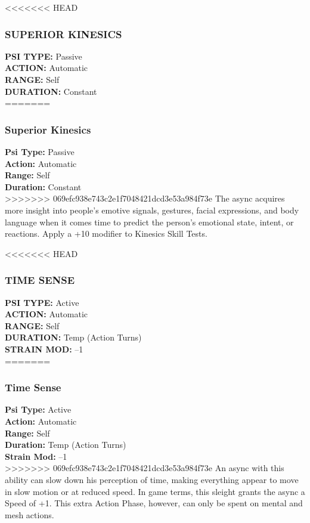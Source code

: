 <<<<<<< HEAD
\subsubsection{SUPERIOR KINESICS}
\textbf{PSI TYPE:} Passive \\ 
\textbf{ACTION:} Automatic \\ 
\textbf{RANGE:} Self \\ 
\textbf{DURATION:} Constant \\
=======
\subsubsection{Superior Kinesics}
\textbf{Psi Type:} Passive \\ 
\textbf{Action:} Automatic \\ 
\textbf{Range:} Self \\ 
\textbf{Duration:} Constant \\
>>>>>>> 069efc938e743c2e1f7048421dcd3e53a984f73e
The async acquires more insight into people’s emotive
signals, gestures, facial expressions, and body
language when it comes time to predict the person’s
emotional state, intent, or reactions. Apply a +10
modifier to Kinesics Skill Tests.

<<<<<<< HEAD
\subsubsection{TIME SENSE}
\textbf{PSI TYPE:} Active \\ 
\textbf{ACTION:} Automatic \\ 
\textbf{RANGE:} Self \\ 
\textbf{DURATION:} Temp (Action Turns) \\
\textbf{STRAIN MOD:} –1 \\
=======
\subsubsection{Time Sense}
\textbf{Psi Type:} Active \\ 
\textbf{Action:} Automatic \\ 
\textbf{Range:} Self \\ 
\textbf{Duration:} Temp (Action Turns) \\
\textbf{Strain Mod:} –1 \\
>>>>>>> 069efc938e743c2e1f7048421dcd3e53a984f73e
An async with this ability can slow down his perception
of time, making everything appear to move
in slow motion or at reduced speed. In game terms,
this sleight grants the async a Speed of +1. This extra
Action Phase, however, can only be spent on mental
and mesh actions.

